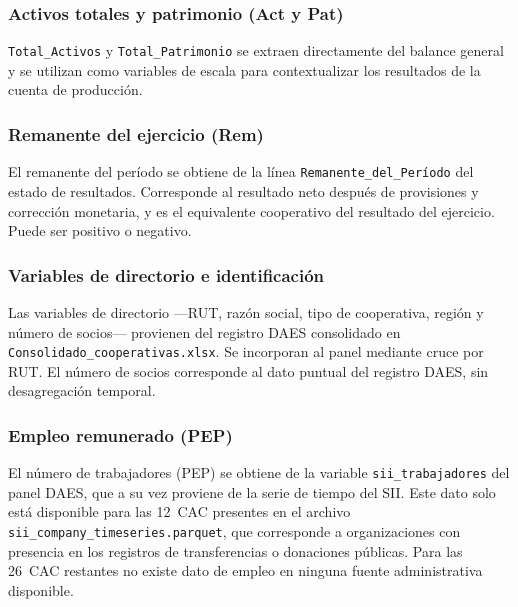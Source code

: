 \subsubsection*{Activos totales y patrimonio (Act y Pat)}

\texttt{Total\_Activos} y \texttt{Total\_Patrimonio} se
extraen directamente del balance general y se utilizan como
variables de escala para contextualizar los resultados de la
cuenta de producción.

\subsubsection*{Remanente del ejercicio (Rem)}

El remanente del período se obtiene de la línea
\texttt{Remanente\_del\_Período} del estado de resultados.
Corresponde al resultado neto después de provisiones y
corrección monetaria, y es el equivalente cooperativo del
resultado del ejercicio. Puede ser positivo o negativo.

\subsubsection*{Variables de directorio e identificación}

Las variables de directorio ---RUT, razón social, tipo de
cooperativa, región y número de socios--- provienen del
registro DAES consolidado en
\texttt{Consolidado\_cooperativas.xlsx}. Se incorporan al
panel mediante cruce por RUT. El número de socios
corresponde al dato puntual del registro DAES, sin
desagregación temporal.

\subsubsection*{Empleo remunerado (PEP)}

El número de trabajadores (PEP) se obtiene de la variable
\texttt{sii\_trabajadores} del panel DAES, que a su vez
proviene de la serie de tiempo del SII. Este dato solo está
disponible para las 12~CAC presentes en el archivo
\texttt{sii\_company\_timeseries.parquet}, que corresponde
a organizaciones con presencia en los registros de
transferencias o donaciones públicas. Para las 26~CAC
restantes no existe dato de empleo en ninguna fuente
administrativa disponible.

